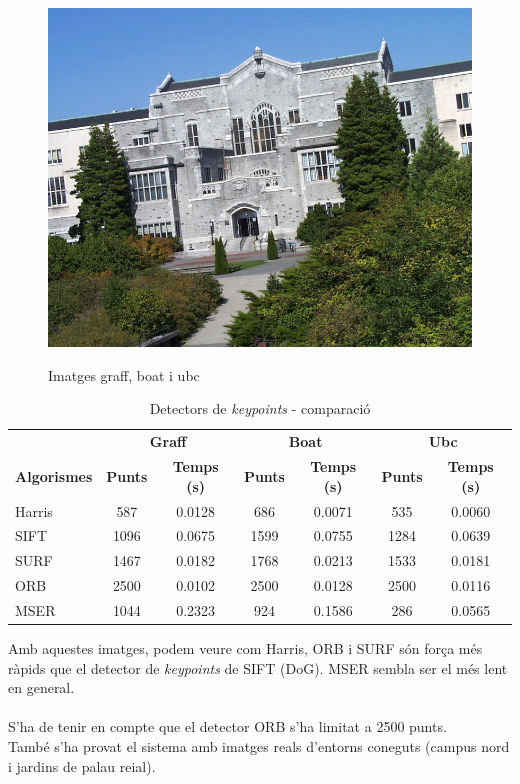 \begin{figure}[!htb]
			\endminipage\hfill
				\includegraphics[width=\linewidth]{images/experiments/ubc}
				\label{fig:awesome_image3}
			\endminipage
			\caption{Imatges graff, boat i ubc}
		\end{figure}

		\begin{table}[H]
			\begin{center}
				\begin{tabular}{l | c c | c c | c c}
					& \multicolumn{2}{c|}{\textbf{Graff}} & \multicolumn{2}{c|}{\textbf{Boat}} & \multicolumn{2}{c}{\textbf{Ubc}} \\
					\textbf{Algorismes} & \textbf{Punts} & \textbf{Temps (s)} & \textbf{Punts} & \textbf{Temps (s)} & \textbf{Punts} & \textbf{Temps (s)} \\ \hline
					Harris & 587 & 0.0128 & 686 & 0.0071 & 535 & 0.0060 \\
					SIFT & 1096 & 0.0675 & 1599 & 0.0755 & 1284 & 0.0639 \\
					SURF & 1467 & 0.0182 & 1768 & 0.0213 & 1533 & 0.0181 \\
					ORB & 2500 & 0.0102 & 2500 & 0.0128 & 2500 & 0.0116 \\
					MSER & 1044 & 0.2323 & 924 & 0.1586 & 286 & 0.0565 \\
				\end{tabular}
			\end{center}
			\caption{Detectors de \textit{keypoints} - comparació}
		\end{table}
		\noindent
		Amb aquestes imatges, podem veure com Harris, ORB i SURF són força més ràpids que el detector de \textit{keypoints} de SIFT (DoG). MSER sembla ser el més lent en general.\\\\
		S'ha de tenir en compte que el detector ORB s'ha limitat a 2500 punts.\\
\newpage
		\noindent
		També s'ha provat el sistema amb imatges reals d'entorns coneguts (campus nord i jardins de palau reial).

